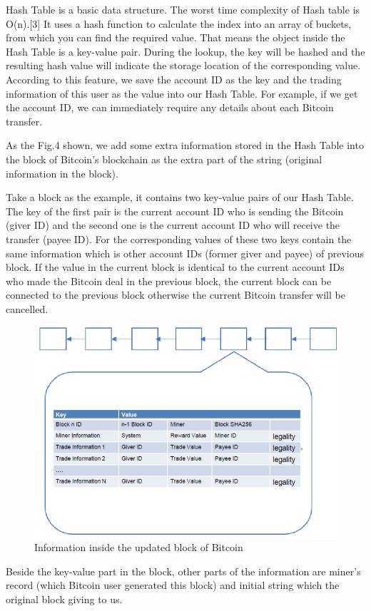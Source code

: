 \documentclass[conference]{IEEEtran}
\begin{document}
Hash Table is a basic data structure. The worst time complexity of Hash table is O(n).[3] It uses a hash function to calculate the index into an array of buckets, from which you can find the required value. That means the object inside the Hash Table is a key-value pair. During the lookup, the key will be hashed and the resulting hash value will indicate the storage location of the corresponding value. According to this feature, we save the account ID as the key and the trading information of this user as the value into our Hash Table. For example, if we get the account ID, we can immediately require any details about each Bitcoin transfer.

As the Fig.4 shown, we add some extra information stored in the Hash Table into the block of Bitcoin’s blockchain as the extra part of the string (original information in the block).

Take a block as the example, it contains two key-value pairs of our Hash Table. The key of the first pair is the current account ID who is sending the Bitcoin (giver ID) and the second one is the current account ID who will receive the transfer (payee ID). For the corresponding values of these two keys contain the same information which is other account IDs (former giver and payee) of previous block. If the value in the current block is identical to the current account IDs who made the Bitcoin deal in the previous block, the current block can be connected to the previous block otherwise the current Bitcoin transfer will be cancelled.

\begin{figure}[ht]
	\centering
	\includegraphics[scale=0.3]{fig4.png}
	\caption{Information inside the updated block of Bitcoin}
	\label{fig:label}
\end{figure}
Beside the key-value part in the block, other parts of the information are miner’s record (which Bitcoin user generated this block) and initial string which the original block giving to us.
\end{document}
